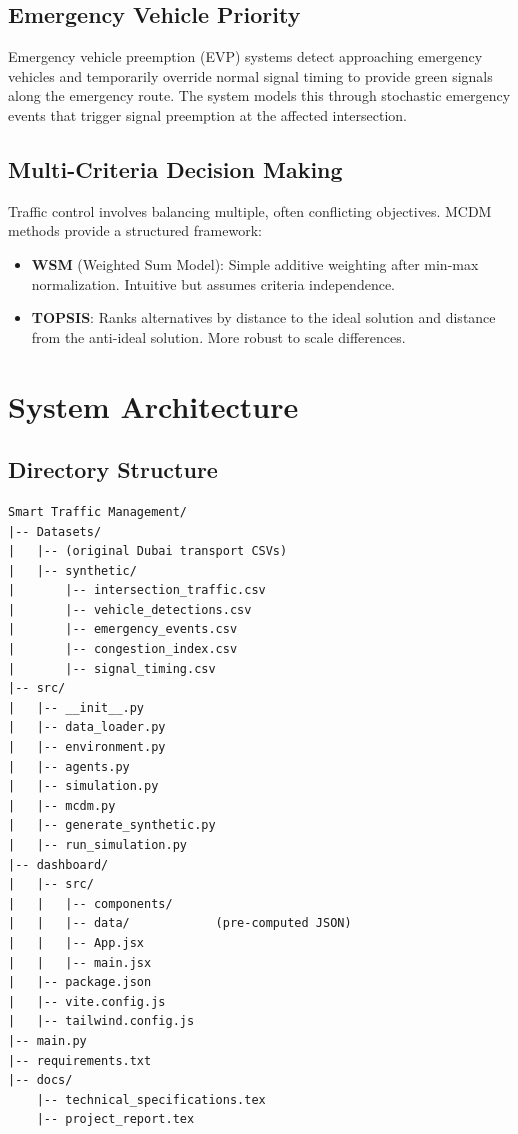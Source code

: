 \documentclass[12pt, a4paper]{article}
\begin{document}
\subsection{Emergency Vehicle Priority}

Emergency vehicle preemption (EVP) systems detect approaching emergency vehicles and temporarily override normal signal timing to provide green signals along the emergency route. The system models this through stochastic emergency events that trigger signal preemption at the affected intersection.

\subsection{Multi-Criteria Decision Making}

Traffic control involves balancing multiple, often conflicting objectives. MCDM methods provide a structured framework:
\begin{itemize}[nosep]
    \item \textbf{WSM} (Weighted Sum Model): Simple additive weighting after min-max normalization. Intuitive but assumes criteria independence.
    \item \textbf{TOPSIS}: Ranks alternatives by distance to the ideal solution and distance from the anti-ideal solution. More robust to scale differences.
\end{itemize}

\section{System Architecture}

\subsection{Directory Structure}

\begin{lstlisting}[language={}, numbers=none]
Smart Traffic Management/
|-- Datasets/
|   |-- (original Dubai transport CSVs)
|   |-- synthetic/
|       |-- intersection_traffic.csv
|       |-- vehicle_detections.csv
|       |-- emergency_events.csv
|       |-- congestion_index.csv
|       |-- signal_timing.csv
|-- src/
|   |-- __init__.py
|   |-- data_loader.py
|   |-- environment.py
|   |-- agents.py
|   |-- simulation.py
|   |-- mcdm.py
|   |-- generate_synthetic.py
|   |-- run_simulation.py
|-- dashboard/
|   |-- src/
|   |   |-- components/
|   |   |-- data/            (pre-computed JSON)
|   |   |-- App.jsx
|   |   |-- main.jsx
|   |-- package.json
|   |-- vite.config.js
|   |-- tailwind.config.js
|-- main.py
|-- requirements.txt
|-- docs/
    |-- technical_specifications.tex
    |-- project_report.tex
\end{lstlisting}
\end{document}
